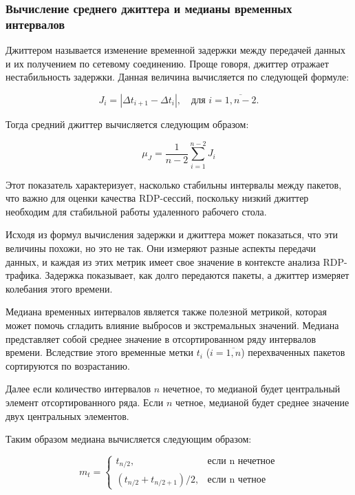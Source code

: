 \documentclass[bachelor, och, coursework]{SCWorks}
\begin{document}
\subsubsection{Вычисление среднего джиттера и медианы временных интервалов}

   Джиттером называется изменение временной задержки между передачей данных и их получением по сетевому соединению.
   Проще говоря, джиттер отражает нестабильность задержки. Данная величина вычисляется по следующей формуле:

   \begin{equation}
      J_i = |\Delta t_{i+1} - \Delta t_i|, \quad \text{для } i = \overline{1, n - 2}.
   \end{equation}

  Тогда средний джиттер вычисляется следующим образом:

   \begin{equation}
    \mu_J = \frac{1}{n-2} \sum_{i=1}^{n-2} J_i
   \end{equation}

   Этот показатель характеризует, насколько стабильны интервалы между пакетов, что важно для оценки качества RDP-сессий, 
   поскольку низкий джиттер необходим для стабильной работы удаленного рабочего стола. 
   
   Исходя из формул вычисления задержки и джиттера может показаться, что эти величины похожи, но это не так. Они измеряют разные 
   аспекты передачи данных, и каждая из этих метрик имеет свое значение в контексте анализа RDP-трафика. Задержка показывает, как долго 
   передаются пакеты, а джиттер измеряет колебания этого времени.

   Медиана временных интервалов является также полезной метрикой, которая может помочь сгладить влияние выбросов и экстремальных значений. 
   Медиана представляет собой среднее значение в отсортированном ряду интервалов времени. Вследствие этого временные метки $t_i$ ($i = \overline{1, n}$) 
   перехваченных пакетов сортируются по возрастанию.
   
   Далее если количество интервалов $ n $ нечетное, то медианой будет центральный элемент отсортированного ряда. 
   Если $ n $ четное, медианой будет среднее значение двух центральных элементов.

   Таким образом медиана вычисляется следующим образом:

   \begin{equation}
    m_t = 
      \begin{cases}
        t_{n / 2}, & \text{если n нечетное}\\
        (t_{n / 2} + t_{n / 2 + 1}) / 2, & \text{если n четное}
      \end{cases}
   \end{equation}
  
\end{document}
